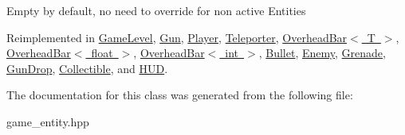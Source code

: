 Empty by default, no need to override for non active Entities 

Reimplemented in \mbox{\hyperlink{class_game_level_ab5570d8406f71f4439a1bda0e7d99efa}{Game\+Level}}, \mbox{\hyperlink{class_gun_a06d6e86fb21f2cb693ef2ad17ba4a720}{Gun}}, \mbox{\hyperlink{class_player_a6912bb6e48efb5845d59f0f4582827ef}{Player}}, \mbox{\hyperlink{class_teleporter_aaaf2de7cb31c11a616cb27ea8f2eb73b}{Teleporter}}, \mbox{\hyperlink{class_overhead_bar_aae76b0fe16f692d330caa057b255804d}{Overhead\+Bar$<$ T $>$}}, \mbox{\hyperlink{class_overhead_bar_aae76b0fe16f692d330caa057b255804d}{Overhead\+Bar$<$ float $>$}}, \mbox{\hyperlink{class_overhead_bar_aae76b0fe16f692d330caa057b255804d}{Overhead\+Bar$<$ int $>$}}, \mbox{\hyperlink{class_bullet_a738b3fde0d24a67ea0a922cbf9693803}{Bullet}}, \mbox{\hyperlink{class_enemy_aa70d742da02995011f1618acc9e303db}{Enemy}}, \mbox{\hyperlink{class_grenade_a619439a6446a856fd5f4116a767fd06c}{Grenade}}, \mbox{\hyperlink{class_gun_drop_aba7b2ebe51dcef4c5b98591e143254fa}{Gun\+Drop}}, \mbox{\hyperlink{class_collectible_aad821fbe9bf46f17e83c1a7082bfc21d}{Collectible}}, and \mbox{\hyperlink{class_h_u_d_a50604853faf2436e5f9d1228137ccf82}{H\+UD}}.



The documentation for this class was generated from the following file\+:\begin{DoxyCompactItemize}
\item 
game\+\_\+entity.\+hpp\end{DoxyCompactItemize}
